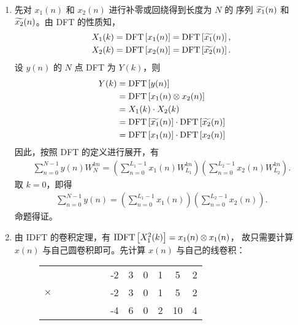\begin{solution}
    \begin{enumerate}[label=(\arabic*)]
        \item 先对 $x_1(n)$ 和 $x_2(n)$ 进行补零或回绕得到长度为 $N$ 的
            序列 $\widetilde{x_1}(n)$ 和 $\widetilde{x_2}(n)$。由 DFT 的性质知，
            \begin{align*}
                X_1(k) = \mathrm{DFT}\left[x_1(n)\right] = \mathrm{DFT}\left[\widetilde{x_1}(n)\right], \\
                X_2(k) = \mathrm{DFT}\left[x_2(n)\right] = \mathrm{DFT}\left[\widetilde{x_2}(n)\right].
            \end{align*}
            设 $y(n)$ 的 $N$ 点 DFT 为 $Y(k)$，则
            \begin{align*}
                Y(k) & = \mathrm{DFT}\left[y(n)\right] \\
                & = \mathrm{DFT}\left[x_1(n) \otimes x_2(n)\right] \\
                & = X_1(k) \cdot X_2(k) \\
                & = \mathrm{DFT}\left[\widetilde{x_1}(n)\right] \cdot \mathrm{DFT}\left[\widetilde{x_2}(n)\right] \\
                & = \mathrm{DFT}\left[x_1(n)\right] \cdot \mathrm{DFT}\left[x_2(n)\right]
            \end{align*}
            因此，按照 DFT 的定义进行展开，有
            \begin{align*}
                \sum_{n = 0}^{N - 1}y(n)W_N^{kn}
                    = \left(\sum_{n = 0}^{L_1 - 1}x_1(n)W_{L_1}^{kn}\right)
                    \left(\sum_{n = 0}^{L_2 - 1}x_2(n)W_{L_2}^{kn}\right).
            \end{align*}
            取 $k = 0$，即得
            \begin{align*}
                \sum_{n = 0}^{N - 1}y(n) = \left(\sum_{n = 0}^{L_1 - 1}x_1(n)\right)\left(\sum_{n = 0}^{L_2 - 1}x_2(n)\right).
            \end{align*}
            命题得证。
        \item 由 IDFT 的卷积定理，有 $\mathrm{IDFT}\left[X_1^2(k)\right] = x_1(n) \otimes x_1(n)$，
            故只需要计算 $x(n)$ 与自己圆卷积即可。先计算 $x(n)$ 与自己的线卷积：
            \begin{figure}[H]
                \centering
                \begin{tabular}{c c c c c c c c c c c c}
                    & & & & & & -2 & 3 & 0 & 1 & 5 & 2 \\
                    $\times$ & & &  & & & -2 & 3 & 0 & 1 & 5 & 2 \\
                    \hline
                    & & & & & & -4 & 6 & 0 & 2 & 10 & 4 \\

\end{tabular}
\end{figure}
\end{enumerate}
\end{solution}
